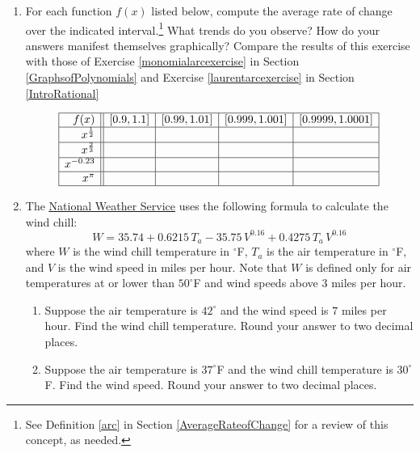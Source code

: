 \documentclass{ximera}
\begin{document}
\begin{enumerate}
\setcounter{enumi}{\value{HW}}

\item \label{powerarcexercise}For each function $f(x)$ listed below, compute the average rate of change over the indicated interval.\footnote{See Definition \ref{arc} in Section \ref{AverageRateofChange} for a review of this concept, as needed.}  What trends do you observe?  How do your answers manifest themselves graphically?  Compare the results of this exercise with those of Exercise \ref{monomialarcexercise} in Section \ref{GraphsofPolynomials} and Exercise \ref{laurentarcexercise} in Section \ref{IntroRational}

\[ \begin{array}{|r||c|c|c|c|}  \hline

 f(x) &  [0.9, 1.1] & [0.99, 1.01] &[0.999, 1.001] & [0.9999, 1.0001]  \\ \hline
 x^{\frac{1}{2}} &&&&  \\  \hline
 x^{\frac{2}{3}} &&&&  \\ \hline
 x^{-0.23} &&&&   \\  \hline
 x^{\pi}  &&&&   \\  \hline

\end{array} \]

\item \label{WindChillTemperature} The \href{http://www.nws.noaa.gov/om/windchill/windchillglossary.shtml}{\underline{National Weather Service}} uses the following formula to calculate the wind chill: \[ W = 35.74 + 0.6215 \, T_{a} - 35.75\, V^{0.16} + 0.4275 \, T_{a} \, V^{0.16}  \] where $W$ is the wind chill temperature in $^{\circ}$F, $T_{a}$ is the air temperature in $^{\circ}$F, and  $V$ is the wind speed in miles per hour.  Note that $W$ is defined only for air temperatures at or lower than $50^{\circ}$F and wind speeds above $3$ miles per hour.

\begin{enumerate}

\item  Suppose the air temperature is $42^{\circ}$ and the wind speed is $7$ miles per hour. Find the wind chill temperature.  Round your answer to two decimal places.

\item  Suppose the air temperature is $37^{\circ}$F and the wind chill temperature is $30^{\circ}$F.  Find the wind speed.  Round your answer to two decimal places. 


\end{enumerate}
\end{enumerate}
\end{document}
